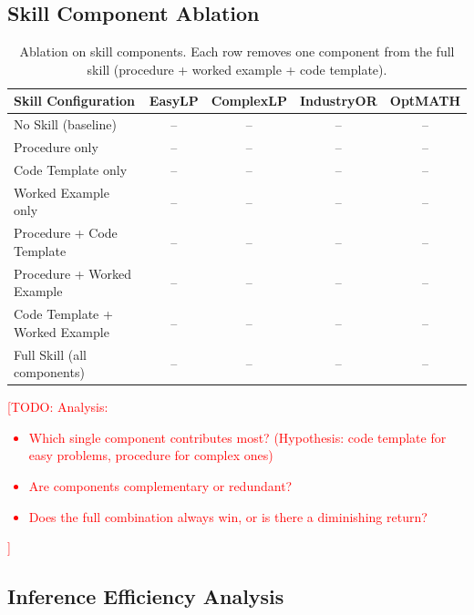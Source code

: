 \documentclass[11pt]{article}
\newcommand{\todo}[1]{\textcolor{red}{[TODO: #1]}}
\begin{document}
\subsection{Skill Component Ablation}
\label{sec:exp_ablation}


\begin{table}[t]
\centering
\caption{Ablation on skill components. Each row removes one component from the full skill (procedure + worked example + code template).}
\label{tab:ablation}
\small
\begin{tabular}{@{}lcccc@{}}
\toprule
\textbf{Skill Configuration} & \textbf{EasyLP} & \textbf{ComplexLP} & \textbf{IndustryOR} & \textbf{OptMATH} \\
\midrule
No Skill (baseline)                       & -- & -- & -- & -- \\
\midrule
Procedure only                            & -- & -- & -- & -- \\
Code Template only                        & -- & -- & -- & -- \\
Worked Example only                       & -- & -- & -- & -- \\
\midrule
Procedure + Code Template                 & -- & -- & -- & -- \\
Procedure + Worked Example                & -- & -- & -- & -- \\
Code Template + Worked Example            & -- & -- & -- & -- \\
\midrule
Full Skill (all components)               & -- & -- & -- & -- \\
\bottomrule
\end{tabular}
\end{table}

\todo{Analysis:
\begin{itemize}
    \item Which single component contributes most? (Hypothesis: code template for easy problems, procedure for complex ones)
    \item Are components complementary or redundant?
    \item Does the full combination always win, or is there a diminishing return?
\end{itemize}
}

\subsection{Inference Efficiency Analysis}
\label{sec:exp_efficiency}
\end{document}
